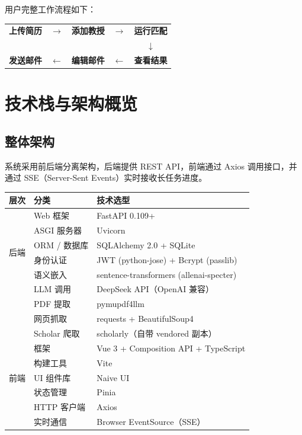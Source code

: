 \documentclass[11pt]{article}
\begin{document}
用户完整工作流程如下：

\begin{center}
\begin{tabular}{ccccc}
\textbf{上传简历} & $\rightarrow$ & \textbf{添加教授} & $\rightarrow$ & \textbf{运行匹配} \\
& & & & $\downarrow$ \\
\textbf{发送邮件} & $\leftarrow$ & \textbf{编辑邮件} & $\leftarrow$ & \textbf{查看结果} \\
\end{tabular}
\end{center}

\section{技术栈与架构概览}

\subsection{整体架构}

系统采用前后端分离架构，后端提供 REST API，前端通过 Axios 调用接口，并通过 SSE（Server-Sent Events）实时接收长任务进度。

\begin{center}
\begin{tabular}{|l|l|l|}
\hline
\textbf{层次} & \textbf{分类} & \textbf{技术选型} \\
\hline
\multirow{6}{*}{后端} & Web 框架 & FastAPI 0.109+ \\
& ASGI 服务器 & Uvicorn \\
& ORM / 数据库 & SQLAlchemy 2.0 + SQLite \\
& 身份认证 & JWT (python-jose) + Bcrypt (passlib) \\
& 语义嵌入 & sentence-transformers (allenai-specter) \\
& LLM 调用 & DeepSeek API（OpenAI 兼容） \\
& PDF 提取 & pymupdf4llm \\
& 网页抓取 & requests + BeautifulSoup4 \\
& Scholar 爬取 & scholarly（自带 vendored 副本） \\
\hline
\multirow{5}{*}{前端} & 框架 & Vue 3 + Composition API + TypeScript \\
& 构建工具 & Vite \\
& UI 组件库 & Naive UI \\
& 状态管理 & Pinia \\
& HTTP 客户端 & Axios \\
& 实时通信 & Browser EventSource（SSE） \\
\hline
\end{tabular}
\end{center}
\end{document}
